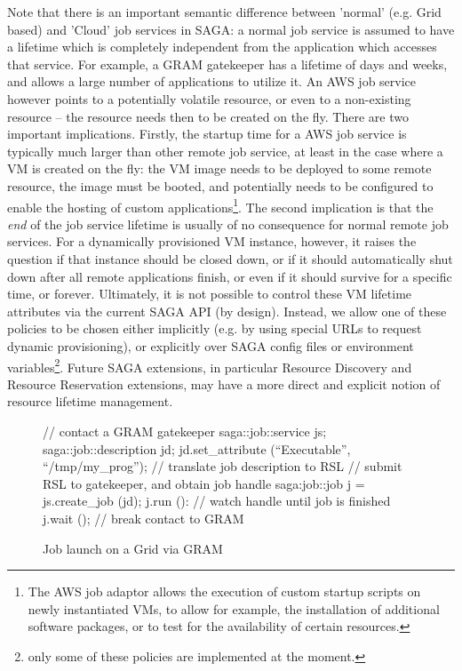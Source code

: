 \documentclass[conference,final]{IEEEtran}
\newcommand{\upp}{\vspace*{-0.6em}}
\newcommand{\I}[1]{\textit{#1}}
\begin{document}
Note that there is an important semantic difference between 'normal'
(e.g. Grid based) and 'Cloud' job services in SAGA: a normal job
service is assumed to have a lifetime which is completely independent
from the application which accesses that service.  For example, a GRAM
gatekeeper has a lifetime of days and weeks, and allows a large number
of applications to utilize it.  An AWS job service however points to a
potentially volatile resource, or even to a non-existing resource --
the resource needs then to be created on the fly.  There are two
important implications.  Firstly, the startup time for a AWS job
service is typically much larger than other remote job service, at
least in the case where a VM is created on the fly: the VM image needs
to be deployed to some remote resource, the image must be booted, and
potentially needs to be configured to enable the hosting of custom
applications\footnote{The AWS job adaptor allows the execution of
  custom startup scripts on newly instantiated VMs, to allow for
  example, the installation of additional software packages, or to
  test for the availability of certain resources.}.  The second
implication is that the \I{end} of the job service lifetime is usually
of no consequence for normal remote job services.  For a dynamically
provisioned VM instance, however, it raises the question if that
instance should be closed down, or if it should automatically shut
down after all remote applications finish, or even if it should
survive for a specific time, or forever.  Ultimately, it is not
possible to control these VM lifetime attributes via the current SAGA
API (by design).  Instead, we allow one of these policies to be
chosen either implicitly (e.g. by using special URLs to request
dynamic provisioning), or explicitly over SAGA config files or
environment variables\footnote{only some of these policies are
  implemented at the moment.}.  Future SAGA extensions, in particular
Resource Discovery and Resource Reservation extensions, may have a
more direct and explicit notion of resource lifetime management.

\begin{figure}[!ht]
\upp 
 \begin{center}
  \begin{mycode}[label=SAGA Job Launch via GRAM gatekeeper]
  { // contact a GRAM gatekeeper
    saga::job::service     js;
    saga::job::description jd;
    jd.set_attribute (``Executable'', ``/tmp/my_prog'');
    // translate job description to RSL
    // submit RSL to gatekeeper, and obtain job handle
    saga:job::job j = js.create_job (jd);
    j.run ():
    // watch handle until job is finished
    j.wait ();
   } // break contact to GRAM
  \end{mycode}
  \caption{\label{gramjob}Job launch on a Grid via GRAM\vspace*{-2em}}
 \end{center}
\upp
\end{figure}
\end{document}
